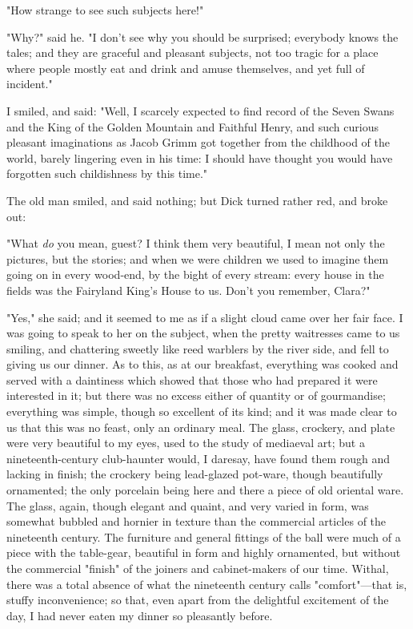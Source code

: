 "How strange to see such subjects here!"

"Why?" said he. "I don't see why you should be surprised; everybody
knows the tales; and they are graceful and pleasant subjects, not too
tragic for a place where people mostly eat and drink and amuse
themselves, and yet full of incident."

I smiled, and said: "Well, I scarcely expected to find record of the
Seven Swans and the King of the Golden Mountain and Faithful Henry, and
such curious pleasant imaginations as Jacob Grimm got together from the
childhood of the world, barely lingering even in his time: I should have
thought you would have forgotten such childishness by this time."

The old man smiled, and said nothing; but Dick turned rather red, and
broke out:

"What \emph{do} you mean, guest? I think them very beautiful, I mean not
only the pictures, but the stories; and when we were children we used to
imagine them going on in every wood-end, by the bight of every stream:
every house in the fields was the Fairyland King's House to us. Don't
you remember, Clara?"

"Yes," she said; and it seemed to me as if a slight cloud came over her
fair face. I was going to speak to her on the subject, when the pretty
waitresses came to us smiling, and chattering sweetly like reed warblers
by the river side, and fell to giving us our dinner. As to this, as at
our breakfast, everything was cooked and served with a daintiness which
showed that those who had prepared it were interested in it; but there
was no excess either of quantity or of gourmandise; everything was
simple, though so excellent of its kind; and it was made clear to us
that this was no feast, only an ordinary meal. The glass, crockery, and
plate were very beautiful to my eyes, used to the study of mediaeval
art; but a nineteenth-century club-haunter would, I daresay, have found
them rough and lacking in finish; the crockery being lead-glazed
pot-ware, though beautifully ornamented; the only porcelain being here
and there a piece of old oriental ware. The glass, again, though elegant
and quaint, and very varied in form, was somewhat bubbled and hornier in
texture than the commercial articles of the nineteenth century. The
furniture and general fittings of the ball were much of a piece with the
table-gear, beautiful in form and highly ornamented, but without the
commercial "finish" of the joiners and cabinet-makers of our time.
Withal, there was a total absence of what the nineteenth century calls
"comfort"---that is, stuffy inconvenience; so that, even apart from the
delightful excitement of the day, I had never eaten my dinner so
pleasantly before.

